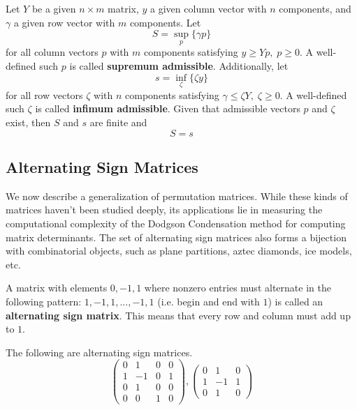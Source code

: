   \begin{theorem}
  Let $Y$ be a given $n \times m$ matrix, $y$ a given column vector with $n$ components, and $\gamma$ a given row vector with $m$ components. Let 
  \[S = \sup_p \{\gamma p\}\]
  for all column vectors $p$ with $m$ components satisfying $y \geq Y p, \; p \geq 0$. A well-defined such $p$ is called \textbf{supremum admissible}. Additionally, let 
  \[s = \inf_\zeta \{ \zeta y\}\]
  for all row vectors $\zeta$ with $n$ components satisfying $\gamma \leq \zeta Y, \; \zeta \geq 0$. A well-defined such $\zeta$ is called \textbf{infimum admissible}. Given that admissible vectors $p$ and $\zeta$ exist, then $S$ and $s$ are finite and 
  \[S = s\]
  \end{theorem}

\subsection{Alternating Sign Matrices}

  We now describe a generalization of permutation matrices. While these kinds of matrices haven't been studied deeply, its applications lie in measuring the computational complexity of the Dodgson Condensation method for computing matrix determinants. The set of alternating sign matrices also forms a bijection with combinatorial objects, such as plane partitions, aztec diamonds, ice models, etc. 

  \begin{definition}
  A matrix with elements $0, -1, 1$ where nonzero entries must alternate in the following pattern: $1, -1, 1, ..., -1, 1$ (i.e. begin and end with $1$) is called an \textbf{alternating sign matrix}. This means that every row and column must add up to $1$. 
  \end{definition}

  \begin{example}
  The following are alternating sign matrices. 
  \[\begin{pmatrix}
  0&1&0&0\\1&-1&0&1\\0&1&0&0\\0&0&1&0
  \end{pmatrix}, \begin{pmatrix}
  0&1&0\\1&-1&1\\0&1&0
  \end{pmatrix}\]
  \end{example}

